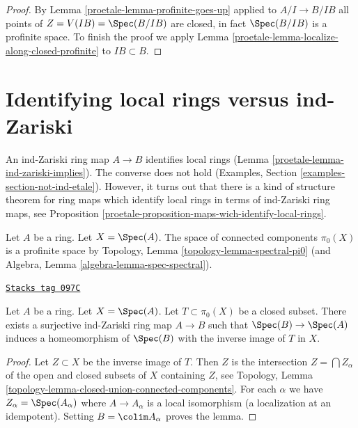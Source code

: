 \begin{proof}

By Lemma \ref{proetale-lemma-profinite-goes-up} applied to $A/I \to B/IB$
all points of $Z = V(IB) = \Spec(B/IB)$ are closed, in fact $\Spec(B/IB)$
is a profinite space.
To finish the proof we apply Lemma \ref{proetale-lemma-localize-along-closed-profinite}
to $IB \subset B$.
\end{proof}

\section{Identifying local rings versus ind-Zariski}
\label{proetale-section-connected-components}
An ind-Zariski ring map $A \to B$ identifies local rings
(Lemma \ref{proetale-lemma-ind-zariski-implies}). The converse does not hold
(Examples, Section \ref{examples-section-not-ind-etale}).
However, it turns out that there is a kind of structure theorem for
ring maps which identify local rings in terms of ind-Zariski
ring maps, see Proposition \ref{proetale-proposition-maps-wich-identify-local-rings}.

\medskip\noindent
Let $A$ be a ring. Let $X = \Spec(A)$. The space of connected
components $\pi_0(X)$ is a profinite space by
Topology, Lemma \ref{topology-lemma-spectral-pi0}
(and Algebra, Lemma \ref{algebra-lemma-spec-spectral}).

\begin{lemma}[Construct]
\label{proetale-lemma-construct}
\href{https://stacks.math.columbia.edu/tag/097C}{\texttt{Stacks tag 097C}}

Let $A$ be a ring. Let $X = \Spec(A)$. Let $T \subset \pi_0(X)$ be a
closed subset. There exists a surjective ind-Zariski ring map $A \to B$
such that $\Spec(B) \to \Spec(A)$ induces a homeomorphism of $\Spec(B)$
with the inverse image of $T$ in $X$.
\end{lemma}

\begin{proof}
Let $Z \subset X$ be the inverse image of $T$. Then $Z$ is the intersection
$Z = \bigcap Z_\alpha$ of the open and closed subsets of $X$ containing $Z$,
see Topology, Lemma \ref{topology-lemma-closed-union-connected-components}.
For each $\alpha$ we have $Z_\alpha = \Spec(A_\alpha)$ where
$A \to A_\alpha$ is a local isomorphism (a localization at an idempotent).
Setting $B = \colim A_\alpha$ proves the lemma.
\end{proof}

